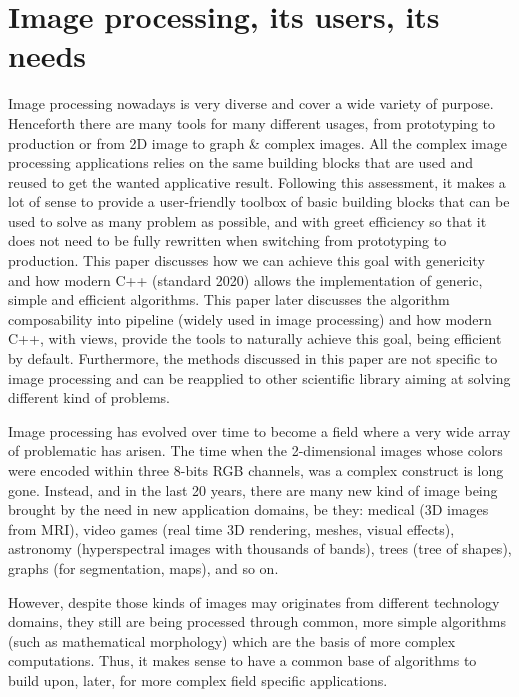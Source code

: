\chapter{Image processing, its users, its needs}
\label{context_and_motivations.chap.image_processing_and_its_needs}

Image processing nowadays is very diverse and cover a wide variety of purpose. Henceforth there are many tools for many
different usages, from prototyping to production or from 2D image to graph \& complex images. All the complex image
processing applications relies on the same building blocks that are used and reused to get the wanted applicative
result. Following this assessment, it makes a lot of sense to provide a user-friendly toolbox of basic building blocks
that can be used to solve as many problem as possible, and with greet efficiency so that it does not need to be fully
rewritten when switching from prototyping to production. This paper discusses how we can achieve this goal with
genericity and how modern C++ (standard 2020) allows the implementation of generic, simple and efficient algorithms.
This paper later discusses the algorithm composability into pipeline (widely used in image processing) and how modern
C++, with views, provide the tools to naturally achieve this goal, being efficient by default. Furthermore, the methods
discussed in this paper are not specific to image processing and can be reapplied to other scientific library aiming at
solving different kind of problems.

Image processing has evolved over time to become a field where a very wide array of problematic has arisen. The time
when the 2-dimensional images whose colors were encoded within three 8-bits RGB channels, was a complex construct is
long gone. Instead, and in the last 20 years, there are many new kind of image being brought by the need in new
application domains, be they: medical (3D images from MRI), video games (real time 3D rendering, meshes, visual
effects), astronomy (hyperspectral images with thousands of bands), trees (tree of shapes), graphs (for segmentation,
maps), and so on.

However, despite those kinds of images may originates from different technology domains, they still are being processed
through common, more simple algorithms (such as mathematical morphology) which are the basis of more complex
computations. Thus, it makes sense to have a common base of algorithms to build upon, later, for more complex field
specific applications.

